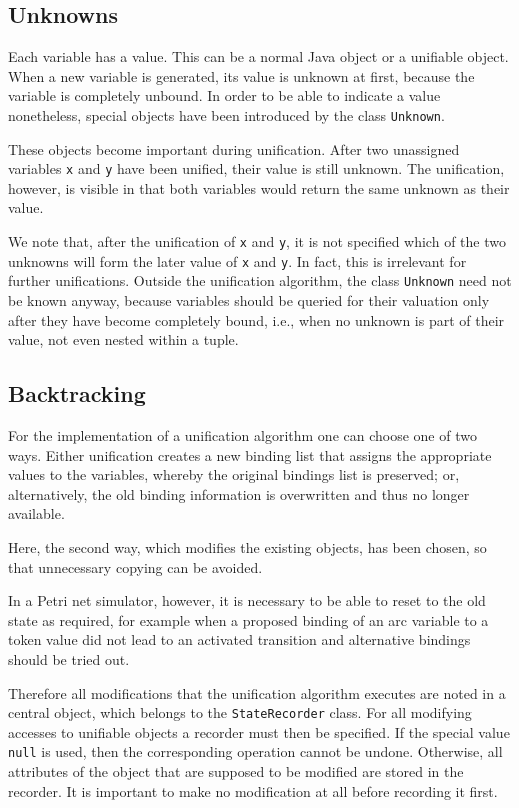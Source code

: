 \subsection{Unknowns}

Each variable has a value. This can be a normal Java object or 
a unifiable object. When a new variable is generated, its value 
is unknown at first, because the variable is completely unbound. 
In order to be able to indicate a value nonetheless, special 
objects have been introduced by the class
\texttt{Unknown}. 

These objects become important during unification. After 
two unassigned variables \texttt{x} and \texttt{y} have been unified, their 
value is still unknown. The unification, however, is visible 
in that both variables would return the same unknown as their value. 

We note that, after the unification of \texttt{x} and \texttt{y},
it is not specified which of the two 
unknowns will form the later value of \texttt{x} and \texttt{y}. 
In fact, this is irrelevant for further unifications.
Outside the unification algorithm, the class \texttt{Unknown}
need not be known anyway, because variables should be
queried for their valuation only after
they have become completely bound, i.e., when no unknown is part
of their value, not even nested within a tuple.

\subsection{Backtracking}

For the implementation of a unification algorithm one can choose 
one of two ways. Either unification creates a new binding list
that assigns the appropriate values to the variables, whereby the 
original bindings list is preserved; or, alternatively, the old 
binding information is overwritten and thus no longer available.
 
Here, the second way, which modifies the existing objects, has 
been chosen, so that unnecessary copying can be avoided. 

In a Petri net simulator, however, it is necessary to be able to 
reset to the old state as required, for example when a
proposed binding of an arc variable to a token value 
did not lead to an activated 
transition and alternative bindings should be tried out. 

Therefore all modifications that the unification algorithm executes 
are noted in a central object, which belongs to the \texttt{StateRecorder}
class. For all modifying accesses to unifiable objects a recorder 
must then be specified. If the special value \texttt{null} is used, then 
the corresponding operation cannot be undone. Otherwise, all attributes
of the object that are supposed to be modified are stored in
the recorder. It is important to make no modification at all before
recording it first.

